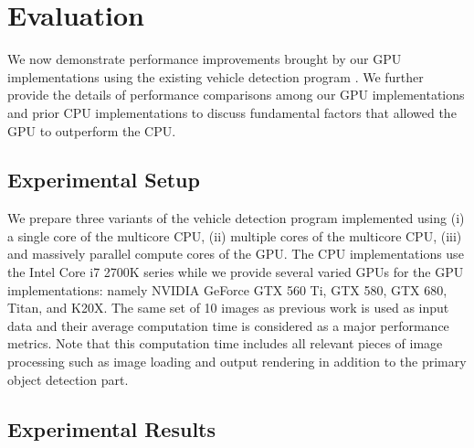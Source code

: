 \section{Evaluation}
\label{sec:evaluation}

We now demonstrate performance improvements brought by our GPU
implementations using the existing vehicle detection program
\cite{Niknejad12}.
We further provide the details of performance comparisons among our GPU
implementations and prior CPU implementations to discuss fundamental
factors that allowed the GPU to outperform the CPU.

\subsection{Experimental Setup}
\label{sec:setup}

We prepare three variants of the vehicle detection program implemented
using (i) a single core of the multicore CPU, (ii) multiple cores of the
multicore CPU, (iii) and massively parallel compute cores of the GPU.
The CPU implementations use the Intel Core i7 2700K series while we
provide several varied GPUs for the GPU implementations: namely NVIDIA
GeForce GTX 560 Ti, GTX 580, GTX 680, Titan, and K20X.
The same set of 10 images as previous work \cite{Niknejad12} is used as
input data and their average computation time is considered as a major
performance metrics.
Note that this computation time includes all relevant pieces of image
processing such as image loading and output rendering in addition to the
primary object detection part.

\subsection{Experimental Results}
\label{sec:results}